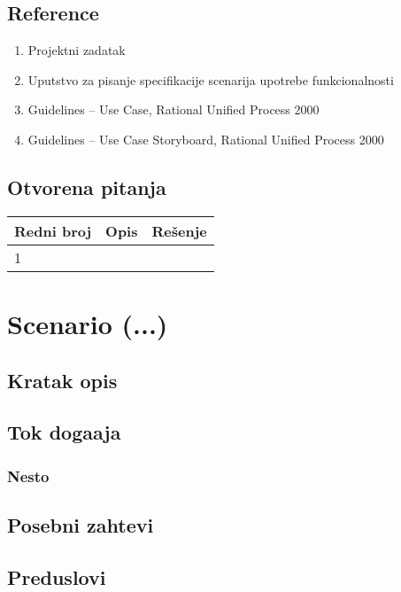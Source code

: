 \documentclass[12pt]{article}
\begin{document}
\subsection{Reference}
\begin{enumerate}
   \item Projektni zadatak
   \item Uputstvo za pisanje specifikacije scenarija upotrebe funkcionalnosti
   \item  Guidelines – Use Case, Rational Unified Process 2000
   \item  Guidelines – Use Case Storyboard, Rational Unified Process 2000
 \end{enumerate}
\subsection{Otvorena pitanja}


\begin{center}
\begin{tabular}{ | m{2cm} | m{7cm}| m{7cm} | } 
\hline
Redni broj& Opis & Rešenje \\ 
\hline
1 &  & \\ 
\hline
\end{tabular}
\end{center}

    

\section{Scenario (...)}
\subsection{Kratak opis}
\subsection{Tok doga\dj aja}

\subsubsection{Nesto}

\subsection{Posebni zahtevi}
\subsection{Preduslovi}
\end{document}
